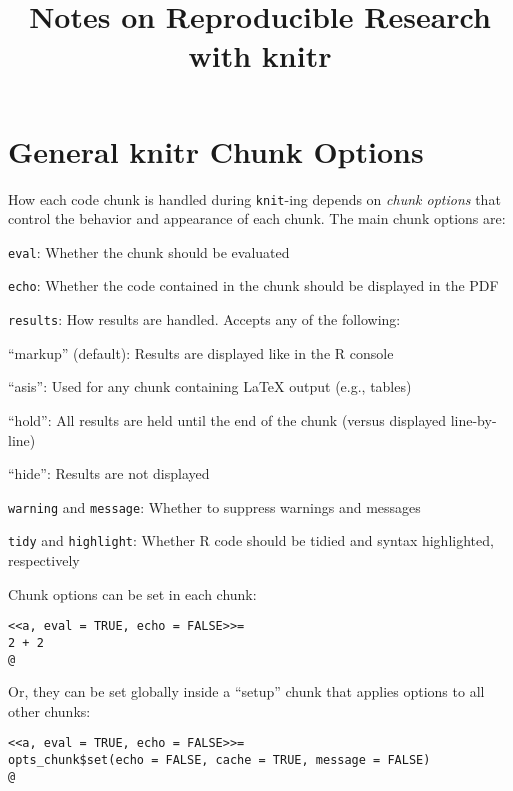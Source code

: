 \documentclass[11pt, a4paper]{article}
\title{Notes on Reproducible Research with knitr}
\date{}
\begin{document}
\maketitle
\onehalfspacing

\section*{General knitr Chunk Options}

How each code chunk is handled during \texttt{knit}-ing depends on \textit{chunk options} that control the behavior and appearance of each chunk. The main chunk options are:

\begin{itemize*}
    \item \texttt{eval}: Whether the chunk should be evaluated
    \item \texttt{echo}: Whether the code contained in the chunk should be displayed in the PDF
    \item \texttt{results}: How results are handled. Accepts any of the following:
        \begin{itemize*}
            \item ``markup'' (default): Results are displayed like in the R console
            \item ``asis'': Used for any chunk containing LaTeX output (e.g., tables)
            \item ``hold'': All results are held until the end of the chunk (versus displayed line-by-line)
            \item ``hide'': Results are not displayed
        \end{itemize*}
    \item \texttt{warning} and \texttt{message}: Whether to suppress warnings and messages
    \item \texttt{tidy} and \texttt{highlight}: Whether R code should be tidied and syntax highlighted, respectively
\end{itemize*}

\noindent Chunk options can be set in each chunk:

\begin{verbatim}
<<a, eval = TRUE, echo = FALSE>>=
2 + 2
@
\end{verbatim}

\vspace{1em}
\noindent Or, they can be set globally inside a ``setup'' chunk that applies options to all other chunks:
\begin{verbatim}
<<a, eval = TRUE, echo = FALSE>>=
opts_chunk$set(echo = FALSE, cache = TRUE, message = FALSE)
@
\end{verbatim}
\end{document}
